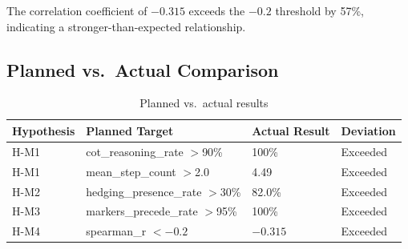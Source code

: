 The correlation coefficient of $-0.315$ exceeds the $-0.2$ threshold by 57\%, indicating a stronger-than-expected relationship.

\subsection{Planned vs.\ Actual Comparison}

\begin{table}[h]
\centering
\begin{tabular}{llll}
\toprule
Hypothesis & Planned Target & Actual Result & Deviation \\
\midrule
H-M1 & cot\_reasoning\_rate $>$90\% & 100\% & Exceeded \\
H-M1 & mean\_step\_count $>$2.0 & 4.49 & Exceeded \\
H-M2 & hedging\_presence\_rate $>$30\% & 82.0\% & Exceeded \\
H-M3 & markers\_precede\_rate $>$95\% & 100\% & Exceeded \\
H-M4 & spearman\_r $< -0.2$ & $-0.315$ & Exceeded \\
\bottomrule
\end{tabular}
\caption{Planned vs.\ actual results}
\label{tab:planned_actual}
\end{table}
